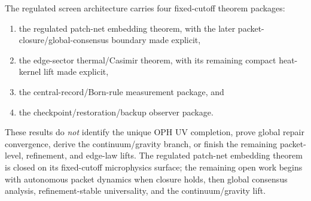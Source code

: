 \documentclass[11pt]{article}
\begin{document}
The regulated screen architecture carries four fixed-cutoff theorem packages:
\begin{enumerate}[leftmargin=2em]
\item the regulated patch-net embedding theorem, with the later packet-closure/global-consensus boundary made explicit,
\item the edge-sector thermal/Casimir theorem, with its remaining compact heat-kernel lift made explicit,
\item the central-record/Born-rule measurement package, and
\item the checkpoint/restoration/backup observer package.
\end{enumerate}

These results do \emph{not} identify the unique OPH UV completion, prove global repair
convergence, derive the continuum/gravity branch, or finish the remaining packet-level,
refinement, and edge-law lifts. The regulated patch-net embedding theorem is closed on its
fixed-cutoff microphysics surface; the remaining open work begins with autonomous packet dynamics
when closure holds, then global consensus analysis, refinement-stable universality, and the
continuum/gravity lift.

\appendix

\end{document}
